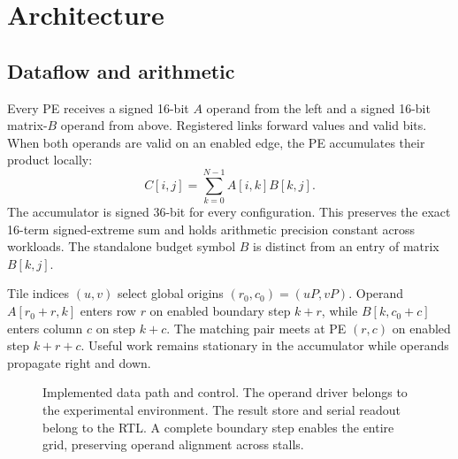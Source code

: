 \documentclass[conference]{IEEEtran}
\begin{document}
\section{Architecture}
\subsection{Dataflow and arithmetic}
Every PE receives a signed 16-bit $A$ operand from the left and a signed 16-bit matrix-$B$ operand from above. Registered links forward values and valid bits. When both operands are valid on an enabled edge, the PE accumulates their product locally:
\begin{equation}
C[i,j]=\sum_{k=0}^{N-1}A[i,k]B[k,j].
\end{equation}
The accumulator is signed 36-bit for every configuration. This preserves the exact 16-term signed-extreme sum and holds arithmetic precision constant across workloads. The standalone budget symbol $B$ is distinct from an entry of matrix $B[k,j]$.

Tile indices $(u,v)$ select global origins $(r_0,c_0)=(uP,vP)$. Operand $A[r_0+r,k]$ enters row $r$ on enabled boundary step $k+r$, while $B[k,c_0+c]$ enters column $c$ on step $k+c$. The matching pair meets at PE $(r,c)$ on enabled step $k+r+c$. Useful work remains stationary in the accumulator while operands propagate right and down.

\begin{figure}[t]
\centering
{}
\caption{Implemented data path and control. The operand driver belongs to the experimental environment. The result store and serial readout belong to the RTL. A complete boundary step enables the entire grid, preserving operand alignment across stalls.}
\label{fig:arch}
\end{figure}
\end{document}
